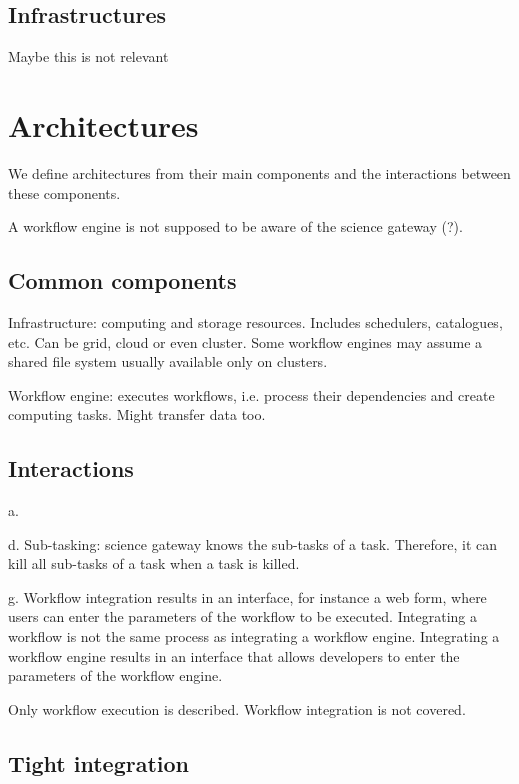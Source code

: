 \documentclass[preprint,3p,twocolumn]{elsarticle}
\newcommand{\todo}[1]{\color{blue} #1 \color{black}}
\begin{document}
\subsection{Infrastructures}

\todo{Maybe this is not relevant}

\section{Architectures}

We define architectures from their main components and the interactions
between these components.

A workflow engine is not supposed to be aware of the science gateway (?).

\subsection{Common components}

Infrastructure: computing and storage resources. Includes
  schedulers, catalogues, etc. Can be grid, cloud or even
  cluster. Some workflow engines may assume a shared file system
  usually available only on clusters.

  Workflow engine: executes workflows, i.e. process their dependencies
  and create computing tasks. Might transfer data too.

\subsection{Interactions}

a. 

d. Sub-tasking: science gateway knows the sub-tasks of a
task. Therefore, it can kill all sub-tasks of a task when a task is killed.

g. Workflow integration results in an interface, for instance a web form,
where users can enter the parameters of the workflow to be
executed. Integrating a workflow is not the same process as
integrating a workflow engine. Integrating a workflow engine results
in an interface that allows developers to enter the parameters of the
workflow engine.


Only workflow execution is described. 
Workflow integration is not covered. 

\subsection{Tight integration}
\end{document}
